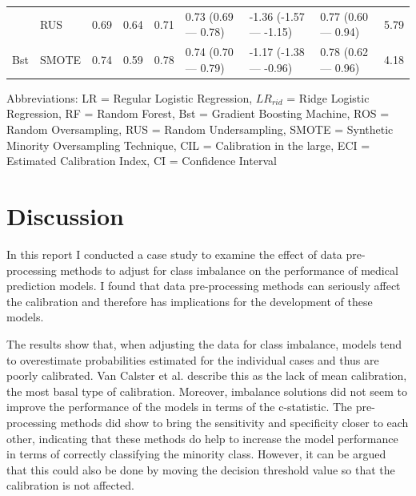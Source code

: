 \documentclass[AMA,STIX1COL, table]{WileyNJD-v2}
\begin{document}
\begin{landscape}
\begin{threeparttable}
\begin{tabular}{lllllllll}
  &RUS & 0.69 & 0.64 & 0.71 & 0.73 (0.69 — 0.78) & -1.36 (-1.57 — -1.15) & 0.77 (0.60 — 0.94) & 5.79 \\ 
  \multirow{-2}{4em}{Bst}&SMOTE & 0.74 & 0.59 & 0.78 & 0.74 (0.70 — 0.79) & -1.17 (-1.38 — -0.96) & 0.78 (0.62 — 0.96) & 4.18 \\ 
   \bottomrule
\end{tabular}
\begin{tablenotes}%
\item Abbreviations: LR = Regular Logistic Regression, $LR_{rid}$ = Ridge Logistic Regression, RF = Random Forest, Bst = Gradient Boosting Machine, ROS = Random Oversampling, RUS = Random Undersampling, SMOTE = Synthetic Minority Oversampling Technique, CIL = Calibration in the large, ECI = Estimated Calibration Index, CI = Confidence Interval
\end{tablenotes}
\end{threeparttable}

\end{landscape}

\section{Discussion}

In this report I conducted a case study to examine the effect of data pre-processing methods to adjust for class imbalance on the performance of medical prediction models. I found that data pre-processing methods can seriously affect the calibration and therefore has implications for the development of these models.

The results show that, when adjusting the data for class imbalance, models tend to overestimate probabilities estimated for the individual cases and thus are poorly calibrated. Van Calster et al.\cite{VanCalster2014} describe this as the lack of mean calibration, the most basal type of calibration. Moreover, imbalance solutions did not seem to improve the performance of the models in terms of the c-statistic. The pre-processing methods did show to bring the sensitivity and specificity closer to each other, indicating that these methods do help to increase the model performance in terms of correctly classifying the minority class. However, it can be argued that this could also be done by moving the decision threshold value so that the calibration is not affected. \cite{Collell2018}  
\end{document}
